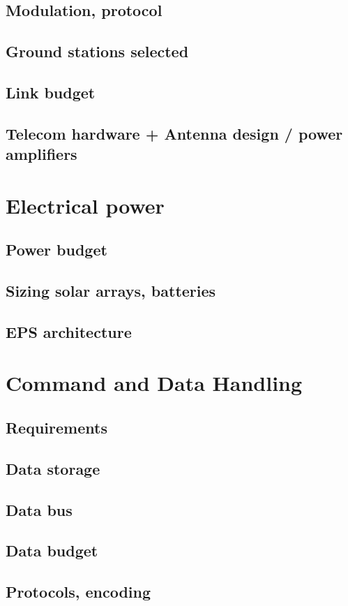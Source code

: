 \subsection{Modulation, protocol}
\subsection{Ground stations selected}
\subsection{Link budget}
\subsection{Telecom hardware + Antenna design / power amplifiers}

\section{Electrical power}
\subsection{Power budget}
\subsection{Sizing solar arrays, batteries}
\subsection{EPS architecture}

\section{Command and Data Handling} 
\subsection{Requirements}
\subsection{Data storage}
\subsection{Data bus}
\subsection{Data budget}
\subsection{Protocols, encoding}

